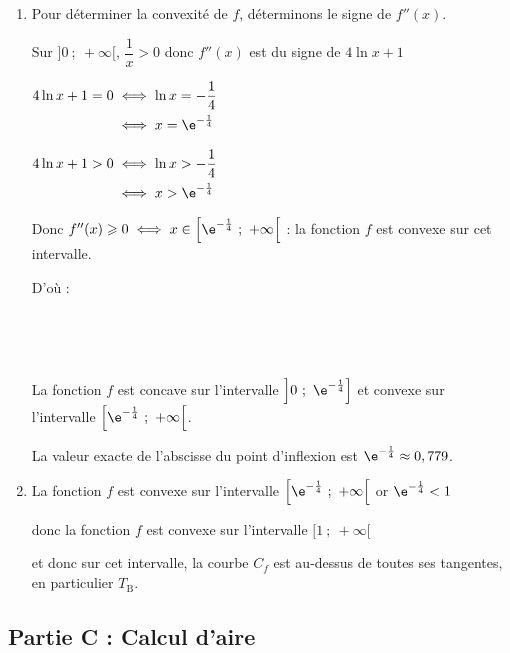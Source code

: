 \begin{enumerate}
\begin{enumerate}
On sait que $u$ étant une fonction de $x$ dérivable $\left(u^n\right)' = n u'u^{n-1}$

Donc pour tout $x$ appartenant à $]0~;~ +\infty[$:

$f''(x)= 2 \times 2 \ln x \times \dfrac{1}{x} + \dfrac{1}{x}-0 =\dfrac{1}{x}(4 \ln x + 1)$.

	\item Pour déterminer la convexité de $f$, déterminons le signe de $f''(x)$.

Sur $]0~;~+\infty[$, $\dfrac{1}{x} > 0$ donc $f''(x)$ est du signe de  $4 \ln x+1 $

$\begin{aligned} 4 \ln x+1 =0&  \iff \ln x = -\dfrac{1}{4}\\
	&\iff x = \e^{-\frac{1}{4}}
\end{aligned}$

$\begin{aligned} 4 \ln x+1 > 0& \iff \ln x > -\dfrac{1}{4}\\
			&\iff x > \e^{-\frac{1}{4}}
\end{aligned}$

Donc $f''(x) \geqslant 0 \iff x \in \left[\e^{-\frac{1}{4}}~;~+ \infty\right[$ : la fonction $f$ est convexe sur cet intervalle.

D'où :

\hfill~\hfill~

La fonction $f$ est concave sur  l'intervalle $\left]0~;~ \e^{-\frac{1}{4}}\right]$ et convexe sur l'intervalle $\left[ \e^{-\frac{1}{4}}~;~+\infty\right[$.

La valeur exacte de l'abscisse du point d'inflexion est $\e^{-\frac{1}{4}} \approx 0,779$.

		\item La fonction $f$ est convexe sur l'intervalle $\left[ \e^{-\frac{1}{4}}~;~+\infty\right[$
or $\e^{-\frac{1}{4}} <1$

donc la fonction $f$ est  convexe sur l'intervalle $[1~;~+\infty[$

et donc sur cet intervalle, la courbe $C_{f}$ est au-dessus de toutes ses tangentes, en particulier $T_{\mathrm{B}}$.
	\end{enumerate}
\end{enumerate}

\subsection*{Partie C : Calcul d'aire}


